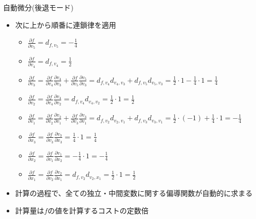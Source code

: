 \begin{frame}[t,fragile]{自動微分(後退モード)}
  \begin{itemize}
  \item 次に上から順番に連鎖律を適用
    \begin{itemize}
    \item $\frac{\partial f}{\partial v_5} = d_{f,v_5} = -\frac{1}{4}$
    \item $\frac{\partial f}{\partial v_4} = d_{f,v_4} = \frac{1}{2}$
    \item $\frac{\partial f}{\partial v_3} = \frac{\partial f}{\partial v_4} \frac{\partial v_4}{\partial v_3} +  \frac{\partial f}{\partial v_5} \frac{\partial v_5}{\partial v_3}  = d_{f,v_4} d_{v_4,v_3} + d_{f,v_5} d_{v_5,v_3} = \frac{1}{2} \cdot 1 -\frac{1}{4} \cdot 1 = \frac{1}{4}$
    \item $\frac{\partial f}{\partial v_2} = \frac{\partial f}{\partial v_4} \frac{\partial v_4}{\partial v_2} = d_{f,v_4} d_{v_4,v_2} =  \frac{1}{2} \cdot 1 = \frac{1}{2}$
    \item $\frac{\partial f}{\partial v_1} = \frac{\partial f}{\partial v_2} \frac{\partial v_2}{\partial v_1} +  \frac{\partial f}{\partial v_3} \frac{\partial v_3}{\partial v_1} = d_{f,v_2} d_{v_2,v_1} + d_{f,v_3} d_{v_3,v_1} = \frac{1}{2} \cdot (-1) + \frac{1}{4} \cdot 1 = -\frac{1}{4}$
    \item $\frac{\partial f}{\partial x_3} = \frac{\partial f}{\partial v_3} \frac{\partial v_3}{\partial x_3} = \frac{1}{4} \cdot 1 = \frac{1}{4}$
    \item $\frac{\partial f}{\partial x_2} = \frac{\partial f}{\partial v_1} \frac{\partial v_1}{\partial x_2} = -\frac{1}{4} \cdot 1 = -\frac{1}{4}$
    \item $\frac{\partial f}{\partial x_1} = \frac{\partial f}{\partial v_2} \frac{\partial v_2}{\partial x_1} = d_{f,v_2} d_{v_2,x_1} = \frac{1}{2} \cdot 1 = \frac{1}{2}$
    \end{itemize}
  \item 計算の過程で、全ての独立・中間変数に関する偏導関数が自動的に求まる
  \item 計算量は$f$の値を計算するコストの定数倍

  \end{itemize}
\end{frame}
